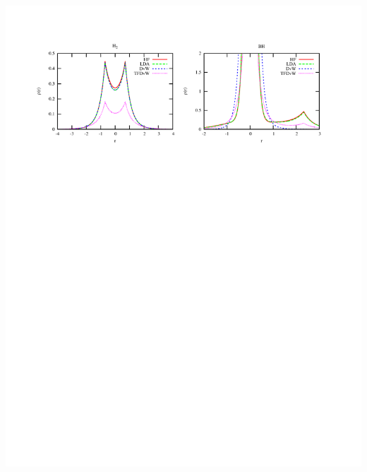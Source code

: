 \documentclass[mathserif, 8pt]{beamer}
\begin{document}
\begin{frame}
    \includegraphics[scale=0.6, viewport = 50 560 550 755]{figures/of_molecules.pdf}
    \ \\
    \ \\
    \ \\
\end{frame}
\end{document}
